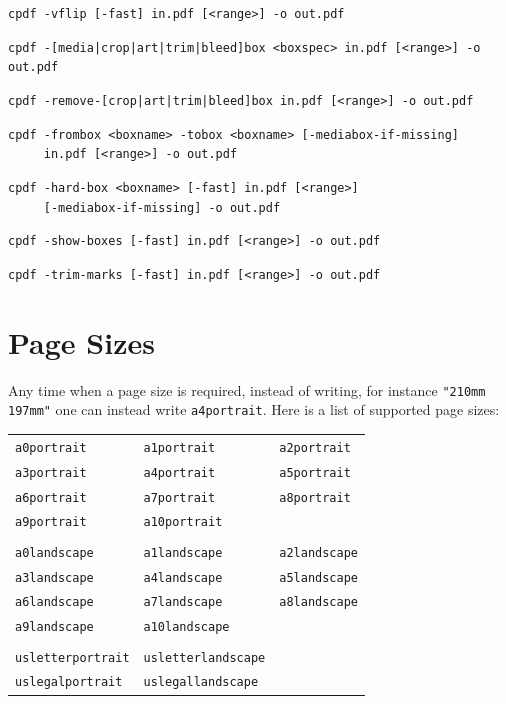 \documentclass{book}
\newcommand{\smallgap}{\bigskip}
\begin{document}
\begin{framed}
  \vspace{1.5mm}
  \small\noindent\verb!cpdf -vflip [-fast] in.pdf [<range>] -o out.pdf!

  \vspace{1.5mm}
  \small\noindent\verb!cpdf -[media|crop|art|trim|bleed]box <boxspec> in.pdf [<range>] -o out.pdf!

  \vspace{1.5mm}
  \small\noindent\verb!cpdf -remove-[crop|art|trim|bleed]box in.pdf [<range>] -o out.pdf!

  \vspace{1.5mm}
  \small\noindent\verb!cpdf -frombox <boxname> -tobox <boxname> [-mediabox-if-missing]! \\
  \noindent\verb!     in.pdf [<range>] -o out.pdf!

  \vspace{1.5mm}
  \small\noindent\verb!cpdf -hard-box <boxname> [-fast] in.pdf [<range>]!\\
  \small\noindent\verb!     [-mediabox-if-missing] -o out.pdf!

  \vspace{1.5mm}
  \small\noindent\verb!cpdf -show-boxes [-fast] in.pdf [<range>] -o out.pdf!

  \vspace{1.5mm}
  \small\noindent\verb!cpdf -trim-marks [-fast] in.pdf [<range>] -o out.pdf!

  \end{framed}

  \section{Page Sizes}
\label{papersizes}
  Any time when a page size is required, instead of writing, for instance \texttt{"210mm 197mm"} one can instead write \texttt{a4portrait}. Here is a list of supported page sizes:

{\small
  \smallgap
  \begin{tabular}{lll}
  \texttt{a0portrait} & \texttt{a1portrait} & \texttt{a2portrait} \\
  \texttt{a3portrait} & \texttt{a4portrait} & \texttt{a5portrait} \\
  \texttt{a6portrait} & \texttt{a7portrait} & \texttt{a8portrait} \\
  \texttt{a9portrait} & \texttt{a10portrait} & \\
  \\
  \texttt{a0landscape} & \texttt{a1landscape} & \texttt{a2landscape} \\
  \texttt{a3landscape} & \texttt{a4landscape} & \texttt{a5landscape} \\
  \texttt{a6landscape} & \texttt{a7landscape} & \texttt{a8landscape} \\
  \texttt{a9landscape} & \texttt{a10landscape} & \\
  \\
  \texttt{usletterportrait} & \texttt{usletterlandscape} & \\
  \texttt{uslegalportrait} & \texttt{uslegallandscape} &
  \end{tabular}
}
\bigskip
\end{document}

